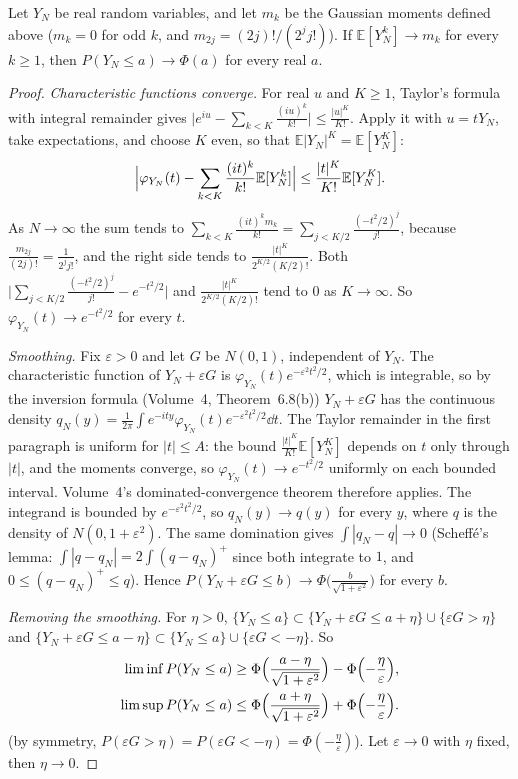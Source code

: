 \begin{lemma}\label{lem:momentslaw}
Let $Y_N$ be real random variables, and let $m_k$ be the Gaussian moments defined above ($m_k=0$ for odd $k$, and $m_{2j}=(2j)!/(2^j j!)$). If $\mathbb E[Y_N^k]\to m_k$ for every $k\ge1$, then $P(Y_N\le a)\to\Phi(a)$ for every real $a$.
\end{lemma}
\begin{proof}
\emph{Characteristic functions converge.} For real $u$ and $K\ge1$, Taylor's formula with integral remainder gives $\bigl|e^{iu}-\sum_{k<K}\frac{(iu)^k}{k!}\bigr|\le\frac{|u|^K}{K!}$. Apply it with $u=tY_N$, take expectations,
and choose $K$ even, so that $\mathbb E|Y_N|^K=\mathbb E[Y_N^K]$:
\[
\Bigl|\varphi_{Y_N}(t)-\sum_{k<K}\frac{(it)^k}{k!}\mathbb E[Y_N^k]\Bigr|\le\frac{|t|^K}{K!}\mathbb E[Y_N^K].
\]
As $N\to\infty$ the sum tends to $\sum_{k<K}\frac{(it)^km_k}{k!}=\sum_{j<K/2}\frac{(-t^2/2)^j}{j!}$, because $\frac{m_{2j}}{(2j)!}=\frac1{2^jj!}$, and the right side tends to $\frac{|t|^K}{2^{K/2}(K/2)!}$. Both
$\bigl|\sum_{j<K/2}\frac{(-t^2/2)^j}{j!}-e^{-t^2/2}\bigr|$ and $\frac{|t|^K}{2^{K/2}(K/2)!}$ tend to $0$ as $K\to\infty$. So $\varphi_{Y_N}(t)\to e^{-t^2/2}$ for every $t$.

\emph{Smoothing.} Fix $\varepsilon>0$ and let $G$ be $N(0,1)$, independent of $Y_N$. The characteristic function of $Y_N+\varepsilon G$ is $\varphi_{Y_N}(t)e^{-\varepsilon^2t^2/2}$, which is integrable, so by the inversion formula
(Volume~4, Theorem~6.8(b)) $Y_N+\varepsilon G$ has the continuous density $q_N(y)=\frac1{2\pi}\int e^{-ity}\varphi_{Y_N}(t)e^{-\varepsilon^2t^2/2}\dd t$. The Taylor remainder in the first paragraph is uniform for $|t|\le A$: the bound $\frac{|t|^K}{K!}\mathbb E[Y_N^K]$ depends on $t$ only through $|t|$, and the moments converge, so $\varphi_{Y_N}(t)\to e^{-t^2/2}$ uniformly on each bounded interval. Volume~4's dominated-convergence theorem therefore applies. The integrand is bounded by $e^{-\varepsilon^2t^2/2}$,
so $q_N(y)\to q(y)$ for every $y$, where $q$ is the density of $N(0,1+\varepsilon^2)$. The same domination gives $\int|q_N-q|\to0$ (Scheffé's lemma: $\int|q-q_N|=2\int(q-q_N)^+$ since both integrate to $1$, and $0\le(q-q_N)^+\le q$). Hence $P(Y_N+\varepsilon G\le b)\to\Phi\bigl(\frac b{\sqrt{1+\varepsilon^2}}\bigr)$ for every $b$.

\emph{Removing the smoothing.} For $\eta>0$, $\{Y_N\le a\}\subset\{Y_N+\varepsilon G\le a+\eta\}\cup\{\varepsilon G>\eta\}$ and $\{Y_N+\varepsilon G\le a-\eta\}\subset\{Y_N\le a\}\cup\{\varepsilon G<-\eta\}$. So
\[
\begin{aligned}\liminf P(Y_N\le a)&\ge\Phi\Bigl(\frac{a-\eta}{\sqrt{1+\varepsilon^2}}\Bigr)-\Phi\Bigl(-\frac\eta\varepsilon\Bigr),\\\limsup P(Y_N\le a)&\le\Phi\Bigl(\frac{a+\eta}{\sqrt{1+\varepsilon^2}}\Bigr)+\Phi\Bigl(-\frac\eta\varepsilon\Bigr).\end{aligned}
\]
(by symmetry, $P(\varepsilon G>\eta)=P(\varepsilon G<-\eta)=\Phi(-\frac\eta\varepsilon)$). Let $\varepsilon\to0$ with $\eta$ fixed, then $\eta\to0$.
\end{proof}

